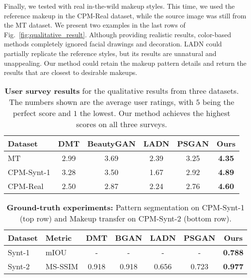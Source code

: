 \documentclass[final]{cvpr}
\newcommand{\Fref}[1]{Fig.~\ref{#1}}
\begin{document}
 Finally, we tested with real in-the-wild makeup styles. This time, we used the reference makeup in the CPM-Real dataset, while the source image was still from the MT dataset. We present two examples in the last rows of \Fref{fig:qualitative_result}. Although providing realistic results, color-based methods completely ignored facial drawings and decoration. LADN could partially replicate the reference styles, but its results are unnatural and unappealing. Our method could retain the makeup pattern details and return the results that are closest to desirable makeups.




\begin{table}[t]
\small
  \centering
\setlength{\tabcolsep}{2.5pt}
  \begin{tabular}[t]{lccccc}
    \toprule
    Dataset & DMT& BeautyGAN& LADN& PSGAN& Ours \\ \midrule
    MT \cite{beautygan} & 2.99& 3.69& 2.39& 3.25& \textbf{4.35} \\
    CPM-Synt-1& 3.28& 3.50& 1.67& 2.92& \textbf{4.89} \\
    CPM-Real& 2.50& 2.87& 2.24 & 2.76& \textbf{4.60} \\ \bottomrule 
  \end{tabular}
  \vskip -0.1in
  \caption{{\bf User survey results} for the qualitative results from three datasets. The numbers shown are the average user ratings, with $5$ being the perfect score and $1$ the lowest. Our method achieves the highest scores on all three surveys.}
    \label{tab:user_survey}
\end{table}

\begin{table}[t]
\small
  \centering
\setlength{\tabcolsep}{3pt}
  \begin{tabular}[t]{llccccc}
    \toprule
    Dataset & Metric & DMT& BGAN& LADN& PSGAN& Ours \\ \midrule
    Synt-1 & mIOU & -& -& -& -& \textbf{0.788} \\ \midrule
    Synt-2 & MS-SSIM &0.918& 0.918& 0.656& 0.723& \textbf{0.977} \\\bottomrule 
  \end{tabular}
  \vskip -0.1in
  \caption{\textbf{Ground-truth experiments:} Pattern segmentation on CPM-Synt-1 (top row) and Makeup transfer on CPM-Synt-2 (bottom row).}
    \label{tab:segmentation_perf}
    \vspace{-3mm}
\end{table}
\end{document}
